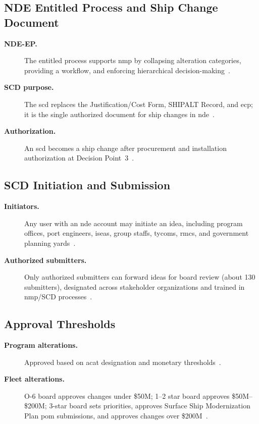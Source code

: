 \documentclass[../main.tex]{subfiles}
\begin{document}
\subsection{NDE Entitled Process and Ship Change Document}
\begin{description}
  \item[\textbf{NDE-EP.}] The entitled process supports \ac{nmp} by collapsing alteration categories, providing a workflow, and enforcing hierarchical decision-making~\autocite{edo-4-1-2-navy-modernization-2025,SL720-AA-MAN-030}.
  \item[\textbf{SCD purpose.}] The \ac{scd} replaces the Justification/Cost Form, SHIPALT Record, and \ac{ecp}; it is the single authorized document for ship changes in \ac{nde}~\autocite{edo-4-1-2-navy-modernization-2025,SL720-AA-MAN-030,JFMM-VolVI-RevD-Chg5-2025}.
  \item[\textbf{Authorization.}] An \ac{scd} becomes a ship change after procurement and installation authorization at Decision Point~3~\autocite{edo-4-1-2-navy-modernization-2025,SL720-AA-MAN-030,JFMM-VolVI-RevD-Chg5-2025}.
\end{description}

\subsection{SCD Initiation and Submission}
\begin{description}
  \item[\textbf{Initiators.}] Any user with an \ac{nde} account may initiate an idea, including program offices, port engineers, \acp{isea}, group staffs, \acp{tycom}, \acp{rmc}, and government planning yards~\autocite{edo-4-1-2-navy-modernization-2025,SL720-AA-MAN-030}.
  \item[\textbf{Authorized submitters.}] Only authorized submitters can forward ideas for board review (about 130 submitters), designated across stakeholder organizations and trained in \ac{nmp}/SCD processes~\autocite{edo-4-1-2-navy-modernization-2025,SL720-AA-MAN-030}.
\end{description}

\subsection{Approval Thresholds}
\begin{description}
  \item[\textbf{Program alterations.}] Approved based on \ac{acat} designation and monetary thresholds~\autocite{edo-4-1-2-navy-modernization-2025,SL720-AA-MAN-030}.
  \item[\textbf{Fleet alterations.}] O-6 board approves changes under \$50M; 1--2 star board approves \$50M--\$200M; 3-star board sets priorities, approves Surface Ship Modernization Plan \ac{pom} submissions, and approves changes over \$200M~\autocite{edo-4-1-2-navy-modernization-2025,SL720-AA-MAN-030}.
\end{description}
\end{document}
